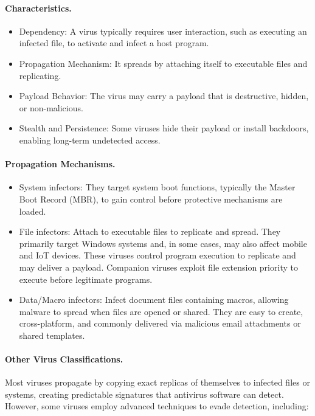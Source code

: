 \paragraph{Characteristics.}
\begin{itemize}
  \item Dependency: A virus typically requires user interaction, such as executing an infected file, to activate and infect a host program.
  \item Propagation Mechanism: It spreads by attaching itself to executable files and replicating.
  \item Payload Behavior: The virus may carry a payload that is destructive, hidden, or non-malicious.
  \item Stealth and Persistence: Some viruses hide their payload or install backdoors, enabling long-term undetected access.
\end{itemize}

\paragraph{Propagation Mechanisms.}
\begin{itemize}
  \item System infectors: They target system boot functions, typically the Master Boot Record (MBR), to gain control before protective mechanisms are loaded.
  \item File infectors: Attach to executable files to replicate and spread. They primarily target Windows systems and, in some cases, may also affect mobile and IoT devices. These viruses control program execution to replicate and may deliver a payload. Companion viruses exploit file extension priority to execute before legitimate programs.
  \item Data/Macro infectors: Infect document files containing macros, allowing malware to spread when files are opened or shared. They are easy to create, cross-platform, and commonly delivered via malicious email attachments or shared templates.
\end{itemize}

\paragraph{Other Virus Classifications.}
Most viruses propagate by copying exact replicas of themselves to infected files or systems, creating predictable signatures that antivirus software can detect. However, some viruses employ advanced techniques to evade detection, including:

